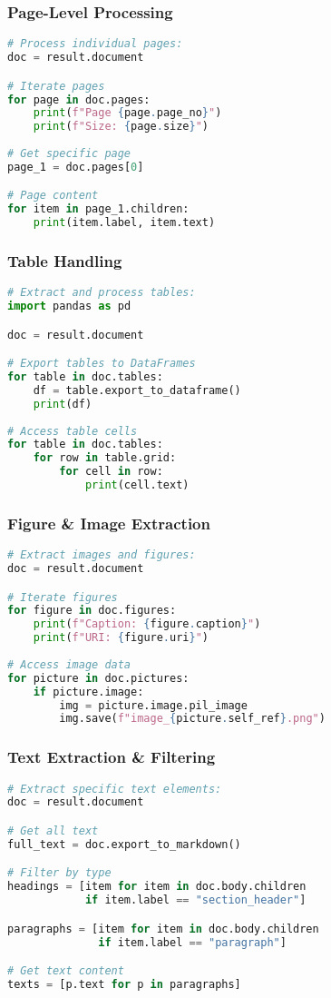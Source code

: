 \begin{frame}[fragile]\frametitle{Page-Level Processing}
\begin{lstlisting}[language=python,basicstyle=\tiny]
# Process individual pages:
doc = result.document

# Iterate pages
for page in doc.pages:
    print(f"Page {page.page_no}")
    print(f"Size: {page.size}")
    
# Get specific page
page_1 = doc.pages[0]

# Page content
for item in page_1.children:
    print(item.label, item.text)
\end{lstlisting}
\end{frame}

\begin{frame}[fragile]\frametitle{Table Handling}
\begin{lstlisting}[language=python,basicstyle=\tiny]
# Extract and process tables:
import pandas as pd

doc = result.document

# Export tables to DataFrames
for table in doc.tables:
    df = table.export_to_dataframe()
    print(df)
    
# Access table cells
for table in doc.tables:
    for row in table.grid:
        for cell in row:
            print(cell.text)
\end{lstlisting}
\end{frame}

\begin{frame}[fragile]\frametitle{Figure \& Image Extraction}
\begin{lstlisting}[language=python,basicstyle=\tiny]
# Extract images and figures:
doc = result.document

# Iterate figures
for figure in doc.figures:
    print(f"Caption: {figure.caption}")
    print(f"URI: {figure.uri}")
    
# Access image data
for picture in doc.pictures:
    if picture.image:
        img = picture.image.pil_image
        img.save(f"image_{picture.self_ref}.png")
\end{lstlisting}
\end{frame}

\begin{frame}[fragile]\frametitle{Text Extraction \& Filtering}
\begin{lstlisting}[language=python,basicstyle=\tiny]
# Extract specific text elements:
doc = result.document

# Get all text
full_text = doc.export_to_markdown()

# Filter by type
headings = [item for item in doc.body.children 
            if item.label == "section_header"]

paragraphs = [item for item in doc.body.children 
              if item.label == "paragraph"]

# Get text content
texts = [p.text for p in paragraphs]
\end{lstlisting}
\end{frame}

